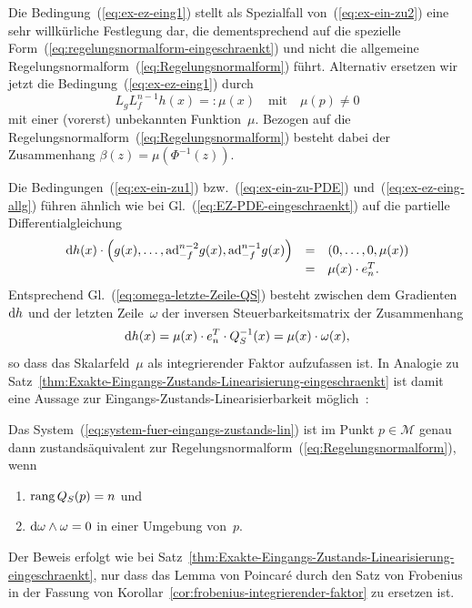 Die Bedingung~(\ref{eq:ex-ez-eing1}) stellt als Spezialfall von~(\ref{eq:ex-ein-zu2})
eine sehr will\-kür\-liche Festlegung dar, die dementsprechend auf
die spezielle Form~(\ref{eq:regelungsnormalform-eingeschraenkt})
und nicht die allgemeine Regelungsnormalform~(\ref{eq:Regelungsnormalform})
führt. Alternativ ersetzen wir jetzt die Bedingung~(\ref{eq:ex-ez-eing1})
durch
\begin{equation}
L_{g}L_{f}^{n-1}h(x)=:\mu(x)\quad\text{mit}\quad\mu(p)\neq0\label{eq:ex-ez-eing-allg}
\end{equation}
mit einer (vorerst) unbekannten Funktion~$\mu$. Bezogen auf die
Regelungsnormalform~(\ref{eq:Regelungsnormalform}) besteht dabei
der Zusammenhang $\beta(z)=\mu(\Phi^{-1}(z))$.

Die Bedingungen~(\ref{eq:ex-ein-zu1}) bzw.~(\ref{eq:ex-ein-zu-PDE})
und~(\ref{eq:ex-ez-eing-allg}) führen ähnlich wie bei Gl.~(\ref{eq:EZ-PDE-eingeschraenkt})
auf die partielle Differentialgleichung 
\begin{equation}
\begin{array}{ccl}
{\mathrm{d}} h(x)\cdot\left(g(x),\ldots,{\operatorname{ad}}_{-f}^{n-2}g(x),{\operatorname{ad}}_{-f}^{n-1}g(x)\right) & = & \left(0,\ldots,0,\mu(x)\right)\\
 & = & \mu(x)\cdot e_{n}^{T}.
\end{array}\label{eq:EZ-PDE-integr-Faktor}
\end{equation}
Entsprechend Gl.~(\ref{eq:omega-letzte-Zeile-QS}) besteht zwischen
dem Gradienten~${\mathrm{d}} h$ und der letzten Zeile~$\omega$ der inversen
Steuerbarkeitsmatrix der Zusammenhang
\[
{\mathrm{d}} h(x)=\mu(x)\cdot e_{n}^{T}\cdot Q_{S}^{-1}(x)=\mu(x)\cdot\omega(x),
\]
so dass das Skalarfeld~$\mu$ als integrierender
Faktor aufzufassen ist. In Analogie zu Satz~\ref{thm:Exakte-Eingangs-Zustands-Linearisierung-eingeschraenkt}
ist damit eine Aussage zur Eingangs-Zustands-Linearisierbarkeit möglich~\cite{franke2012pamm}:
\begin{theorem}
\label{thm:Exakte-Eingangs-Zustands-Linearisierung-Formen}Das System~(\ref{eq:system-fuer-eingangs-zustands-lin})
ist im Punkt $p\in\mathcal{M}$ genau dann zustands\-äquivalent zur
Regelungsnormalform~(\ref{eq:Regelungsnormalform}), wenn
\begin{enumerate}
\item ${\operatorname{rang}}\,Q_{S}(p)=n$ und
\item ${\mathrm{d}}\omega\wedge\omega=0$ in einer Umgebung von~$p$.
\end{enumerate}
\end{theorem}
\begin{svmultproof2}
Der Beweis erfolgt wie bei Satz~\ref{thm:Exakte-Eingangs-Zustands-Linearisierung-eingeschraenkt},
nur dass das Lemma von Poincaré durch den Satz von Frobenius
in der Fassung von Korollar~\ref{cor:frobenius-integrierender-faktor}
zu ersetzen ist.
\end{svmultproof2}

